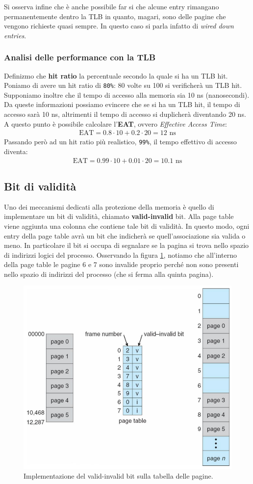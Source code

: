 Si osserva infine che è anche possibile far si che alcune entry rimangano permanentemente dentro la TLB in quanto, magari, sono delle pagine che vengono richieste quasi sempre. In questo caso si parla infatto di \textit{wired down entries}.
% 
\subsubsection*{Analisi delle performance con la TLB}
Definizmo che \textbf{hit ratio} la percentuale secondo la quale si ha un TLB hit. Poniamo di avere un hit ratio di \texttt{80\%}: 80 volte su 100 si verificherà un TLB hit. Supponiamo inoltre che il tempo di accesso alla memoria sia 10 ns (nanosecondi). Da queste informazioni possiamo evincere che se si ha un TLB hit, il tempo di accesso sarà 10 ns, altrimenti il tempo di accesso si duplicherà diventando 20 ns. A questo punto è possibile calcolare l'\textbf{EAT}, ovvero \textit{Effective Access Time}:
\begin{gather*}
    \text{EAT} = 0.8 \cdot 10 + 0.2 \cdot 20 = 12\text{ ns}
\end{gather*}
Passando però ad un hit ratio più realistico, \texttt{99\%}, il tempo effettivo di accesso diventa:
\begin{gather*}
    \text{EAT} = 0.99 \cdot 10 + 0.01 \cdot 20 = 10.1\text{ ns}
\end{gather*}

% 
\subsection{Bit di validità}
Uno dei meccanismi dedicati alla protezione della memoria è quello di implementare un bit di validità, chiamato \textbf{valid-invalid} bit. Alla page table viene aggiunta una colonna che contiene tale bit di validità. In questo modo, ogni entry della page table avrà un bit che indicherà se quell'associazione sia valida o meno. In particolare il bit si occupa di segnalare se la pagina si trova nello spazio di indirizzi logici del processo. Osservando la figura \ref{fig:valid-invalid_bit}, notiamo che all'interno della page table le pagine 6 e 7 sono invalide proprio perché non sono presenti nello spazio di indirizzi del processo (che si ferma alla quinta pagina).
\begin{figure}[h]
    \centering
    \includegraphics[width = .6\textwidth]{../res/imgs/main memory/valid-invalid_bit.png}
    \caption{Implementazione del valid-invalid bit sulla tabella delle pagine.}
    \label{fig:valid-invalid_bit}
\end{figure}

